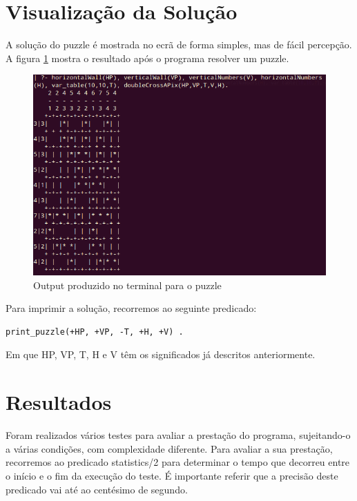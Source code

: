 \documentclass[runningheads,a4paper]{llncs}
\begin{document}
\section{Visualização da Solução}

A solução do puzzle é mostrada no ecrã de forma simples, mas de fácil percepção. A figura \ref{fig:outputboard} mostra o resultado após o programa resolver um puzzle.

\begin{figure}[h]
\centering
\includegraphics[scale=0.5]{res/output.png}
\caption{Output produzido no terminal para o puzzle}
\label{fig:outputboard}
\end{figure}

Para imprimir a solução, recorremos ao seguinte predicado:

\begin{lstlisting}
print_puzzle(+HP, +VP, -T, +H, +V) .
\end{lstlisting}

Em que HP, VP, T, H e V têm os significados já descritos anteriormente.

\section{Resultados}

Foram realizados vários testes para avaliar a prestação do programa, sujeitando-o a várias condições, com complexidade diferente. Para avaliar a sua prestação, recorremos ao predicado statistics/2 para determinar o tempo que decorreu entre o início e o fim da execução do teste. É importante referir que a precisão deste predicado vai até ao centésimo de segundo.
\end{document}
